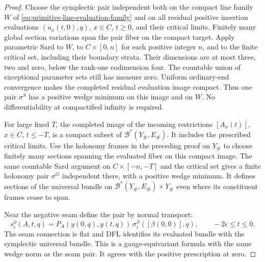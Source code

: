 \documentclass[11pt]{amsart}
\theoremstyle{definition}
\theoremstyle{remark}
\theoremstyle{plain}
\begin{document}
\begin{proof}
Choose the symplectic pair independent both on the compact
line family $W$ of \eqref{eq:primitive-line-evaluation-family}
and on all residual positive insertion evaluations
$(u_x(t,0),q)$, $x\in C$, $t\geq0$, and their critical limits.
Finitely many global section variations span the pair fiber on
the compact target. Apply parametric Sard to $W$, to
$C\times[0,n]$ for each positive integer $n$, and to the
finite critical set, including their boundary strata.
Their dimensions are at most three, two and zero, below
the rank-one codimension four. The countable union of
exceptional parameter sets still has measure zero.
Uniform ordinary-end convergence makes the completed residual
evaluation image compact. Thus one pair $\sigma^S$ has a
positive wedge minimum on this image and on $W$.
No differentiability at compactified infinity is required.

For large fixed $T$, the completed image of the incoming
restrictions $[A_x(t)]$, $x\in C$, $t\leq-T$, is a compact
subset of $\mathcal B^*(Y_\#,E_\#)$.
It includes the prescribed critical limits. Use the holonomy
frames in the preceding proof on $Y_\#$ to choose finitely
many sections spanning the evaluated fiber on this compact
image. The same countable Sard argument on
$C\times[-n,-T]$ and the critical set gives a finite holonomy
pair $\sigma^G$ independent there, with a positive wedge
minimum. It defines sections of the universal bundle on
$\mathcal B^*(Y_\#,E_\#)\times Y_\#$ even where its
constituent frames cease to span.

Near the negative seam define the pair by normal transport:
\begin{equation}\label{eq:positive-end-seam-sections}
 s_i^\partial(A,t,q)
       =P_A(y(0,q),y(t,q))\,
                      \sigma_i^S([\beta(0,0)],q),
                      \qquad -2\epsilon\leq t\leq0.
\end{equation}
The seam connection is flat and DFL identifies its evaluated
bundle with the symplectic universal bundle. This is a
gauge-equivariant formula with the same wedge norm as the
seam pair. It agrees with the positive prescription at zero.


\end{proof}
\end{document}
